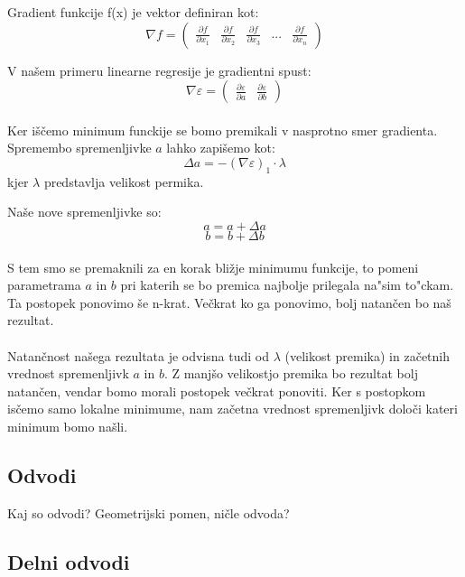 \documentclass[a4paper, 12pt]{article}
\begin{document}
	Gradient funkcije f(x) je vektor definiran kot:
	$$\nabla f = \begin{pmatrix}\frac{\partial f}{\partial x_{1}} & \frac{\partial f}{\partial x_{2}} & \frac{\partial f}{\partial x_{3}} & ... & \frac{\partial f}{\partial x_{n}}\end{pmatrix}$$
	
	V našem primeru linearne regresije je gradientni spust:
	$$\nabla \varepsilon =
	\begin{pmatrix}
	\frac{\partial \varepsilon}{\partial a} &
	\frac{\partial \varepsilon}{\partial b} 
	\end{pmatrix}$$
	
	\paragraph{}
	Ker iščemo minimum funckije se bomo premikali v nasprotno smer gradienta. Spremembo spremenljivke $a$ lahko zapišemo kot:
	$$\Delta a = -(\nabla \varepsilon)_1 \cdot \lambda$$
	kjer $\lambda$ predstavlja velikost permika.
	
	Naše nove spremenljivke so:
	$$ a = a + \Delta a$$
	$$ b = b + \Delta b$$
	
	\paragraph{}
	S tem smo se premaknili za en korak bližje minimumu funkcije, to pomeni parametrama $a$ in $b$ pri katerih se bo premica najbolje prilegala na"sim to"ckam. Ta postopek ponovimo še n-krat. Večkrat ko ga ponovimo, bolj natančen bo naš rezultat.
	
	\paragraph{}
	Natančnost našega rezultata je odvisna tudi od $\lambda$ (velikost premika) in začetnih vrednost spremenljivk $a$ in $b$. Z manjšo velikostjo premika bo rezultat bolj natančen, vendar bomo morali postopek večkrat ponoviti. Ker s postopkom isčemo samo lokalne minimume, nam začetna vrednost spremenljivk določi kateri minimum bomo našli.
	
	\subsection*{Odvodi}
	Kaj so odvodi? Geometrijski pomen, ničle odvoda?
	
	\subsection*{Delni odvodi}
\end{document}
